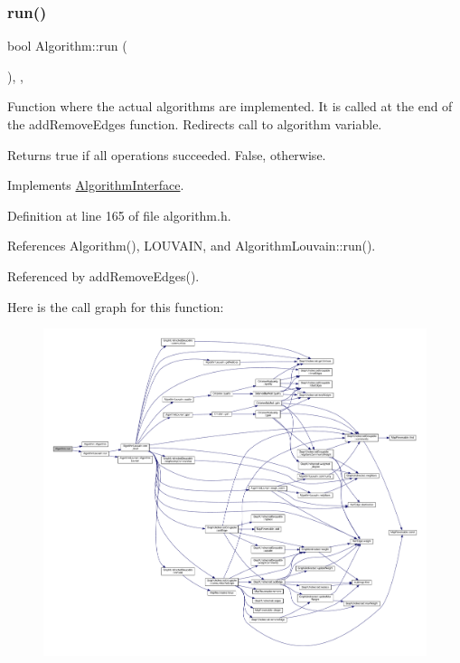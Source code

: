 \subsubsection{\texorpdfstring{run()}{run()}}
{\footnotesize\ttfamily bool Algorithm\+::run (\begin{DoxyParamCaption}{ }\end{DoxyParamCaption})\hspace{0.3cm}{\ttfamily [inline]}, {\ttfamily [private]}, {\ttfamily [virtual]}}

Function where the actual algorithms are implemented. It is called at the end of the add\+Remove\+Edges function. Redirects call to algorithm variable.

\begin{DoxyReturn}{Returns}
true if all operations succeeded. False, otherwise. 
\end{DoxyReturn}


Implements \hyperlink{classAlgorithmInterface_a0bafcdabd2b5fd45abe97af91e02ca14}{Algorithm\+Interface}.



Definition at line 165 of file algorithm.\+h.



References Algorithm(), L\+O\+U\+V\+A\+IN, and Algorithm\+Louvain\+::run().



Referenced by add\+Remove\+Edges().

Here is the call graph for this function\+:
\nopagebreak
\begin{figure}[H]
\begin{center}
\leavevmode
\includegraphics[width=350pt]{classAlgorithm_a10dcb6b63ba40fad0bf11a0fef7b40f5_cgraph}
\end{center}
\end{figure}
\mbox{\label{classAlgorithm_a3b3172af613b02bfb1dc2502553d91c0}} 
